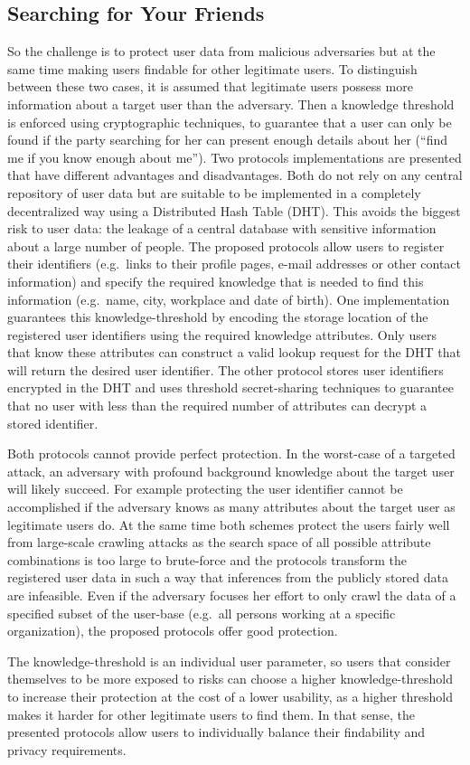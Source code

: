 \subsection{Searching for Your Friends}

So the challenge is to protect user data from malicious adversaries but
at the same time making users findable for other legitimate users. To
distinguish between these two cases, it is assumed that legitimate users
possess more information about a target user than the adversary. Then a
knowledge threshold is enforced using cryptographic techniques, to
guarantee that a user can only be found if the party searching for her
can present enough details about her (\enquote{find me if you know enough about
me}). Two protocols implementations are presented that have different
advantages and disadvantages. Both do not rely on any central repository
of user data but are suitable to be implemented in a completely
decentralized way using a Distributed Hash Table (DHT). This avoids the
biggest risk to user data: the leakage of a central database with
sensitive information about a large number of people.
The proposed protocols allow users to register their identifiers (e.g.\ 
links to their profile pages, e-mail addresses or other contact
information) and specify the required knowledge that is needed to find
this information (e.g.\  name, city, workplace and date of birth). One
implementation guarantees this knowledge-threshold by encoding the
storage location of the registered user identifiers using the required
knowledge attributes. Only users that know these attributes can
construct a valid lookup request for the DHT that will return the
desired user identifier. The other protocol stores user identifiers
encrypted in the DHT and uses threshold secret-sharing techniques to
guarantee that no user with less than the required number of attributes
can decrypt a stored identifier.

Both protocols cannot provide perfect protection. In the worst-case of a
targeted attack, an adversary with profound background knowledge about
the target user will likely succeed. For example protecting the user
identifier cannot be accomplished if the adversary knows as many
attributes about the target user as legitimate users do.
At the same time both schemes protect the users fairly well from
large-scale crawling attacks as the search space of all possible
attribute combinations is too large to brute-force and the protocols
transform the registered user data in such a way that inferences from
the publicly stored data are infeasible. Even if the adversary focuses
her effort to only crawl the data of a specified subset of the user-base
(e.g.\  all persons working at a specific organization), the proposed
protocols offer good protection. 

The knowledge-threshold is an individual user parameter, so users that
consider themselves to be more exposed to risks can choose a higher
knowledge-threshold to increase their protection at the cost of a lower
usability, as a higher threshold makes it harder for other legitimate
users to find them. In that sense, the presented protocols allow users
to individually balance their findability and privacy requirements.


